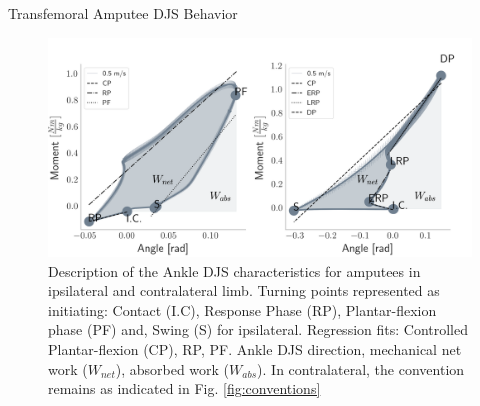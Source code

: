 \documentclass[10pt]{beamer}
\begin{document}
\begin{frame}{Transfemoral Amputee DJS Behavior}
\begin{footnotesize}
\begin{figure}[h]
\begin{center}
\centerline{\includegraphics[scale=0.5]{Feathergraphics/amputee_convention.png}}
\caption{Description of the Ankle DJS characteristics for amputees in ipsilateral and contralateral limb. Turning points represented as initiating: Contact (I.C), Response Phase (RP), Plantar-flexion phase (PF) and, Swing (S) for ipsilateral. Regression fits: Controlled Plantar-flexion (CP), RP, PF. Ankle DJS direction, mechanical net work ($W_{net}$), absorbed work ($W_{abs}$). In contralateral, the convention remains as indicated in Fig. \ref{fig:conventions}}
\label{fig:conventions_amp}
\end{center}
\end{figure}
\end{footnotesize}
\end{frame}
\end{document}
